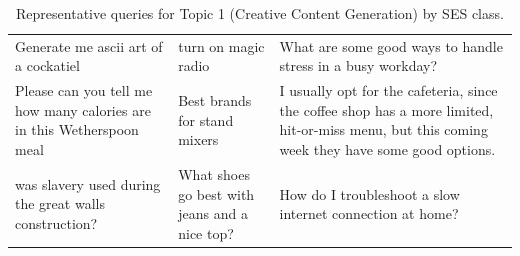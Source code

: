 \begin{table}[ht]
\begin{tabular}{p{4.3cm}p{4.3cm}p{4.3cm}}
Generate me ascii art of a cockatiel & turn on  magic radio & What are some good ways to handle stress in a busy workday? \\[4pt]
Please can you tell me how many calories are in this Wetherspoon meal & Best brands for stand mixers & I usually opt for the cafeteria, since the coffee shop has a more limited, hit-or-miss menu, but this coming week they have some good options. \\[4pt]
was slavery used during the great walls construction? & What shoes go best with jeans and a nice top? & How do I troubleshoot a slow internet connection at home? \\[4pt]
\bottomrule
\end{tabular}
\caption{Representative queries for Topic 1 (Creative Content Generation) by SES class.}
\label{tab:repr_queries_topic1}
\end{table}
